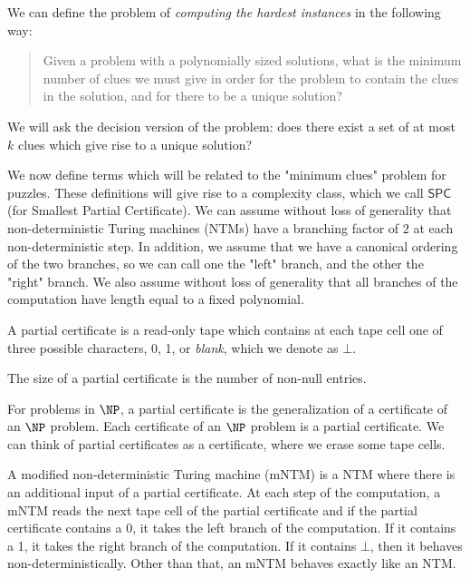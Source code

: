 \documentclass[runningheads,a4paper]{llncs}
\begin{document}
We can define the problem of \emph{computing the hardest instances} in the following way: 

\begin{quote}
Given a problem with a polynomially sized solutions, what is the minimum number of clues we must give in order for the problem to contain the clues in the solution, and for there to be a unique solution?
\end{quote}

We will ask the decision version of the problem: does there exist a set of at most $k$ clues which give rise to a unique solution?

We now define terms which will be related to the "minimum clues" problem for puzzles. These definitions will give rise to a complexity class, which we call  $\mathsf{SPC}$ (for Smallest Partial Certificate). We can assume without loss of generality that non-deterministic Turing machines (NTMs) have a branching factor of $2$ at each non-deterministic step. In addition, we assume that we have a canonical ordering of the two branches, so we can call one the "left" branch, and the other the "right" branch. We also assume without loss of generality that all branches of the computation have length equal to a fixed polynomial.

\begin{definition}
A partial certificate is a read-only tape which contains at each tape cell one of three possible characters, 0, 1, or \emph{blank}, which we denote as $\bot$.
\end{definition}

\begin{definition}
The size of a partial certificate is the number of non-null entries. 
\end{definition}

For problems in $\NP$, a partial certificate is the generalization of a certificate of an $\NP$ problem. Each certificate of an $\NP$ problem is a partial certificate. We can think of partial certificates as a certificate, where we erase some tape cells.

\begin{definition}
A modified non-deterministic Turing machine (mNTM) is a NTM where there is an additional input of a partial certificate. At each step of the computation, a mNTM reads the next tape cell of the partial certificate and if the partial certificate contains a 0, it takes the left branch of the computation. If it contains a 1, it takes the right branch of the computation. If it contains $\bot$, then it behaves non-deterministically. Other than that, an mNTM behaves exactly like an NTM.
\end{definition}
\end{document}
